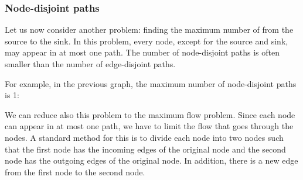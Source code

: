 \subsubsection{Node-disjoint paths}

Let us now consider another problem:
finding the maximum number of
 from the source
to the sink.
In this problem, every node,
except for the source and sink,
may appear in at most one path.
The number of node-disjoint paths is
often smaller than the number of
edge-disjoint paths.

For example, in the previous graph,
the maximum number of node-disjoint paths is 1:

\begin{center}
\end{center}

We can reduce also this problem to the maximum flow problem.
Since each node can appear in at most one path,
we have to limit the flow that goes through the nodes.
A standard method for this is to divide each node into
two nodes such that the first node has the incoming edges
of the original node and the second node has the outgoing
edges of the original node.
In addition, there is a new edge from the first node
to the second node.

